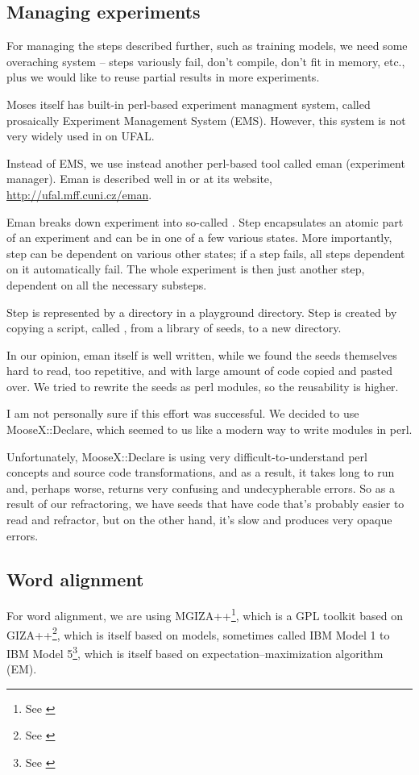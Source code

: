 \subsection{Managing experiments}
For managing the steps described further, such as training models, we need some overaching system -- steps variously fail, don't compile, don't fit in memory, etc., plus we would like to reuse partial results in more experiments.

Moses itself has built-in perl-based experiment managment system, called prosaically Experiment Management System (EMS). However, this system is not very widely used in on UFAL.

Instead of EMS, we use instead another perl-based tool called eman (experiment manager). Eman is described well in \cite{eman} or at its website, \url{http://ufal.mff.cuni.cz/eman}.  

Eman breaks down experiment into so-called . Step encapsulates an atomic part of an experiment and can be in one of a few various states. More importantly, step can be dependent on various other states; if a step fails, all steps dependent on it automatically fail. The whole experiment is then just another step, dependent on all the necessary substeps.

Step is represented by a directory in a playground directory. Step is created by copying a script, called , from a library of seeds, to a new directory.

In our opinion, eman itself is well written, while we found the seeds themselves hard to read, too repetitive, and with large amount of code copied and pasted over. We tried to rewrite the seeds as perl modules, so the reusability is higher.

I am not personally sure if this effort was successful. We decided to use MooseX::Declare, which seemed to us like a modern way to write modules in perl. 

Unfortunately, MooseX::Declare is using very difficult-to-understand perl concepts and source code transformations, and as a result, it takes long to run and, perhaps worse, returns very confusing and undecypherable errors. So as a result of our refractoring, we have seeds that have code that's probably easier to read and refractor, but on the other hand, it's slow and produces very opaque errors.

\subsection{Word alignment}
For word alignment, we are using MGIZA++\footnote{See \cite{mgiza}}, which is a GPL toolkit based on GIZA++\footnote{See \cite{giza}}, which is itself based on models, sometimes called IBM Model 1 to IBM Model 5\footnote{See \cite{ibm}}, which is itself based on expectation–maximization algorithm (EM).

